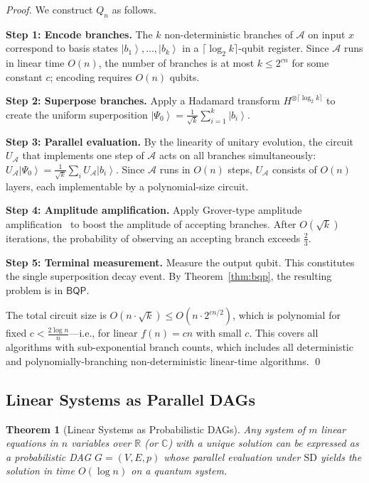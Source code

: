 \documentclass[11pt]{article}
\theoremstyle{plain}
\newtheorem{theorem}{Theorem}[section]
\theoremstyle{definition}
\theoremstyle{remark}
\newcommand{\ket}[1]{\left| #1 \right\rangle}
\newcommand{\bqp}{\ensuremath{\mathsf{BQP}}}
\newcommand{\SD}{\ensuremath{\mathrm{SD}}}   %
\newcommand{\Real}{\mathbb{R}}
\newcommand{\Complex}{\mathbb{C}}
\begin{document}
\begin{proof}
  We construct $Q_n$ as follows.

  \textbf{Step 1: Encode branches.}  The $k$ non-deterministic branches of
  $\mathcal{A}$ on input $x$ correspond to basis states $\ket{b_1}, \ldots,
  \ket{b_k}$ in a $\lceil \log_2 k \rceil$-qubit register.  Since
  $\mathcal{A}$ runs in linear time $O(n)$, the number of branches is at most
  $k \leq 2^{cn}$ for some constant $c$; encoding requires $O(n)$ qubits.

  \textbf{Step 2: Superpose branches.}  Apply a Hadamard transform $H^{\otimes
  \lceil \log_2 k \rceil}$ to create the uniform superposition
  $\ket{\Psi_0} = \frac{1}{\sqrt{k}} \sum_{i=1}^k \ket{b_i}$.

  \textbf{Step 3: Parallel evaluation.}  By the linearity of unitary
  evolution, the circuit $U_{\mathcal{A}}$ that implements one step of
  $\mathcal{A}$ acts on all branches simultaneously:
  $U_{\mathcal{A}} \ket{\Psi_0} = \frac{1}{\sqrt{k}} \sum_i U_{\mathcal{A}}
  \ket{b_i}$.  Since $\mathcal{A}$ runs in $O(n)$ steps, $U_{\mathcal{A}}$
  consists of $O(n)$ layers, each implementable by a polynomial-size circuit.

  \textbf{Step 4: Amplitude amplification.}  Apply Grover-type amplitude
  amplification~\cite{grover1996} to boost the amplitude of accepting branches.
  After $O(\sqrt{k})$ iterations, the probability of observing an accepting
  branch exceeds $\tfrac{2}{3}$.

  \textbf{Step 5: Terminal measurement.}  Measure the output qubit.  This
  constitutes the single superposition decay event.  By
  Theorem~\ref{thm:bqp}, the resulting problem is in $\bqp$.

  The total circuit size is $O(n \cdot \sqrt{k}) \leq O(n \cdot 2^{cn/2})$,
  which is polynomial for fixed $c < \tfrac{2 \log n}{n}$---i.e., for linear
  $f(n) = cn$ with small $c$.  This covers all algorithms with sub-exponential
  branch counts, which includes all deterministic and polynomially-branching
  non-deterministic linear-time algorithms. \qed
\end{proof}

\subsection{Linear Systems as Parallel DAGs}

\begin{theorem}[Linear Systems as Probabilistic DAGs]
  \label{thm:dag}
  Any system of $m$ linear equations in $n$ variables over $\Real$ (or
  $\Complex$) with a unique solution can be expressed as a probabilistic DAG
  $G = (V, E, p)$ whose parallel evaluation under \SD{} yields the solution
  in time $O(\log n)$ on a quantum system.
\end{theorem}
\end{document}
